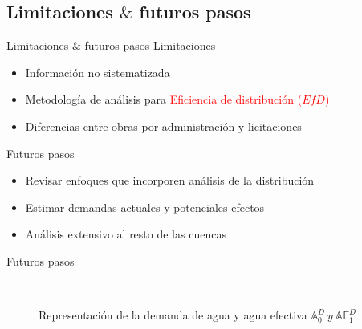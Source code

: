 \documentclass{beamer}\usepackage[]{graphicx}\usepackage[]{color}
\begin{document}
\subsection{Limitaciones $\&$ futuros pasos}
\begin{frame}{Limitaciones $\&$ futuros pasos}
  Limitaciones
  \begin{itemize}
         \item Información no sistematizada          
  \pause \item Metodología de análisis para \textcolor{red}{Eficiencia de distribución ($EfD$)}
  \pause \item Diferencias entre obras por administración y licitaciones
  \end{itemize}
  
  Futuros pasos
  \begin{itemize}
         \item Revisar enfoques que incorporen análisis de la distribución          
  \pause \item Estimar demandas actuales y potenciales efectos
  \pause \item Análisis extensivo al resto de las cuencas
  \end{itemize}
\end{frame}

\begin{frame}{Futuros pasos}
 \begin{figure} \begin{center}  \\
\caption{\label{DemandaAgua}Representación de la demanda de agua y agua efectiva $\mathbb{A}_0^D \ y \ \mathbb{AE}_1^D$}
\end{center}
\end{figure}

\end{frame}
\end{document}
